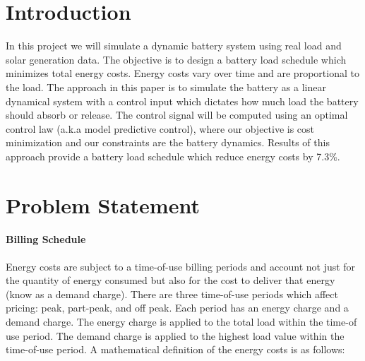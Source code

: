 \documentclass[12pt]{article}
\begin{document}
\maketitle

\section{Introduction}
In this project we will simulate a dynamic battery system using real load and solar generation data. The objective is to design a battery load schedule which minimizes total energy costs. Energy costs vary over time and are proportional to the load. The approach in this paper is to simulate the battery as a linear dynamical system with a control input which dictates how much load the battery should absorb or release. The control signal will be computed using an optimal control law (a.k.a model predictive control), where our objective is cost minimization and our constraints are the battery dynamics. Results of this approach provide a battery load schedule which reduce energy costs by 7.3\%.

\section{Problem Statement}\label{problem statement}
\paragraph{Billing Schedule}
Energy costs are subject to a time-of-use billing periods and account not just for the quantity of energy consumed but also for the cost to deliver that energy (know as a demand charge). There are three time-of-use periods which affect pricing: peak, part-peak, and off peak. Each period has an energy charge and a demand charge. The energy charge is applied to the total load within the time-of use period. The demand charge is applied to the highest load value within the time-of-use period. A mathematical definition of the energy costs is as follows:
\end{document}
